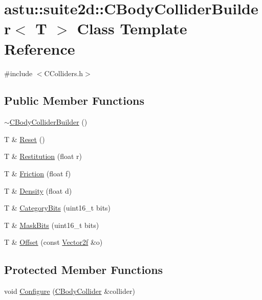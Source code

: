 \hypertarget{classastu_1_1suite2d_1_1CBodyColliderBuilder}{}\section{astu\+:\+:suite2d\+:\+:C\+Body\+Collider\+Builder$<$ T $>$ Class Template Reference}
\label{classastu_1_1suite2d_1_1CBodyColliderBuilder}


{\ttfamily \#include $<$C\+Colliders.\+h$>$}

\subsection*{Public Member Functions}
\begin{DoxyCompactItemize}
\item 
\hyperlink{classastu_1_1suite2d_1_1CBodyColliderBuilder_adca674222b712d757b7ecd0df366edb8}{$\sim$\+C\+Body\+Collider\+Builder} ()
\item 
T \& \hyperlink{classastu_1_1suite2d_1_1CBodyColliderBuilder_ae56a7af01fd76c06336d812884b1789a}{Reset} ()
\item 
T \& \hyperlink{classastu_1_1suite2d_1_1CBodyColliderBuilder_ac65b06a13c81a76e0aefbefd90993ba6}{Restitution} (float r)
\item 
T \& \hyperlink{classastu_1_1suite2d_1_1CBodyColliderBuilder_a5d0fe75d5cc5cb4c3c1a6a503d34d641}{Friction} (float f)
\item 
T \& \hyperlink{classastu_1_1suite2d_1_1CBodyColliderBuilder_a7bedba690f689f1da7650084975a339e}{Density} (float d)
\item 
T \& \hyperlink{classastu_1_1suite2d_1_1CBodyColliderBuilder_ae4db29db8b6500a86b1a9b3b6419a00a}{Category\+Bits} (uint16\+\_\+t bits)
\item 
T \& \hyperlink{classastu_1_1suite2d_1_1CBodyColliderBuilder_a20924e4c791d492ce399ac5a340a6fab}{Mask\+Bits} (uint16\+\_\+t bits)
\item 
T \& \hyperlink{classastu_1_1suite2d_1_1CBodyColliderBuilder_a2fb80e617b4125b355f2e207e9335640}{Offset} (const \hyperlink{classastu_1_1Vector2}{Vector2f} \&o)
\end{DoxyCompactItemize}
\subsection*{Protected Member Functions}
\begin{DoxyCompactItemize}
\item 
void \hyperlink{classastu_1_1suite2d_1_1CBodyColliderBuilder_a64b45a603701bd29ae6cb631258acfe7}{Configure} (\hyperlink{classastu_1_1suite2d_1_1CBodyCollider}{C\+Body\+Collider} \&collider)
\end{DoxyCompactItemize}



